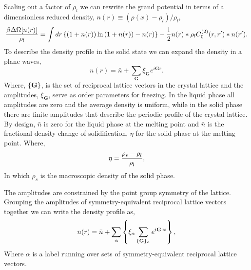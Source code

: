 Scaling out a factor of $\rho_l$ we can rewrite the grand potential in terms of
a dimensionless reduced density, $n(r) \equiv (\rho(x) - \rho_l)/\rho_l$,
%
\begin{equation}
    \label{gp}
    \frac{\beta \Delta \Omega[n(r)]}{\rho_l} =
        \int dr \left\lbrace 
            (1 + n(r))\ln\left(1 + n(r)\right) - n(r)\right\rbrace
        - \frac{1}{2} n(r) \ast \rho_l C^{(2)}_0(r, r^\prime) \ast n(r^\prime).
\end{equation}
%
To describe the density profile in the solid state we can expand the density
in a plane waves,
%
\begin{equation}
    \label{expansion}
    n(r) = \bar{n} + \sum_{\mathbf{G}} \xi_{\mathbf{G}} e^{i \mathbf{G} r}.
\end{equation}
%
Where, $\left\lbrace \mathbf{G} \right\rbrace$, is the set of reciprocal lattice
vectors in the crystal lattice and the amplitudes, $\xi_\mathbf{G}$, serve as
order parameters for freezing. In the liquid phase all amplitudes are zero and
the average density is uniform, while in the solid phase there are finite
amplitudes that describe the periodic profile of the crystal lattice. By
design, $\bar{n}$ is zero for the liquid phase at the melting point and
$\bar{n}$ is the fractional density change of solidification, $\eta$ for the
solid phase at the melting point. Where,
%
\begin{equation}
    \eta = \frac{\rho_s - \rho_l}{\rho_l},
\end{equation}
%
In which $\rho_s$ is the macroscopic density of the solid phase.

The amplitudes are constrained by the point group symmetry of the lattice.
Grouping the amplitudes of symmetry-equivalent reciprocal lattice vectors
together we can write the density profile as,
%
\begin{equation}
    \label{amplitudes}
    n(r) = \bar{n}
         + \sum_\alpha \left\lbrace
            \xi_\alpha \sum_{\lbrace\mathbf{G}\rbrace_\alpha}
                e^{i\mathbf{G} \cdot \mathbf{x}}\right\rbrace,
\end{equation}
%
Where $\alpha$ is a label running over sets of symmetry-equivalent reciprocal
lattice vectors.

